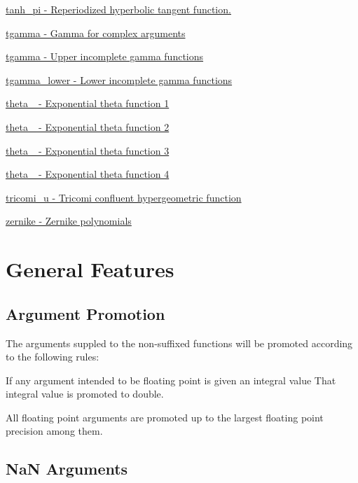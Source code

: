 \begin{DoxyItemize}
\item \hyperlink{group__gnu__math__spec__func_ga8729ffd5acf3266315e9dac1b5a9b3a6}{tanh\+\_\+pi -\/ Reperiodized hyperbolic tangent function.}
\item \hyperlink{group__gnu__math__spec__func_ga73a634663e4eceb1e6bcf3fc16773b7b}{tgamma -\/ Gamma for complex arguments}
\item \hyperlink{group__gnu__math__spec__func_ga73a634663e4eceb1e6bcf3fc16773b7b}{tgamma -\/ Upper incomplete gamma functions}
\item \hyperlink{group__gnu__math__spec__func_gaed107908dec8865ea48e7764f7ea88a2}{tgamma\+\_\+lower -\/ Lower incomplete gamma functions}
\item \hyperlink{group__gnu__math__spec__func_gaa2e5a3a5f550fe032a596a8b01c878c0}{theta\+\_ -\/ Exponential theta function 1}
\item \hyperlink{group__gnu__math__spec__func_ga16f278edeb2842d614bae1f1ae2d0256}{theta\+\_ -\/ Exponential theta function 2}
\item \hyperlink{group__gnu__math__spec__func_ga146c3b8e86991e164d4bf143cda5f0fc}{theta\+\_ -\/ Exponential theta function 3}
\item \hyperlink{group__gnu__math__spec__func_ga8a6f8b69272a9f205a13e1745832ada3}{theta\+\_ -\/ Exponential theta function 4}
\item \hyperlink{group__gnu__math__spec__func_gaf51a13fad85006e4d65c5b117e49f7d8}{tricomi\+\_\+u -\/ Tricomi confluent hypergeometric function}
\item \hyperlink{group__gnu__math__spec__func_gaaed33f29c1eb1d2c5b9590fe2e57151c}{zernike -\/ Zernike polynomials}
\end{DoxyItemize}\hypertarget{index_general}{}\section{General Features}\label{index_general}
\hypertarget{index_promotion}{}\subsection{Argument Promotion}\label{index_promotion}
The arguments suppled to the non-\/suffixed functions will be promoted according to the following rules\+:
\begin{DoxyEnumerate}
\item If any argument intended to be floating point is given an integral value That integral value is promoted to double.
\item All floating point arguments are promoted up to the largest floating point precision among them.
\end{DoxyEnumerate}\hypertarget{index_NaN}{}\subsection{Na\+N Arguments}\label{index_NaN}
